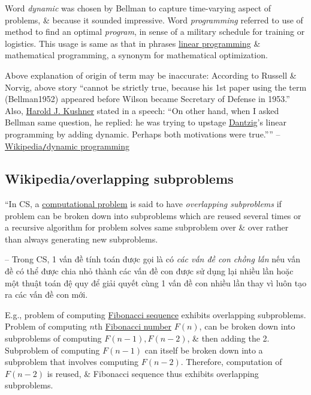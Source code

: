 \documentclass{article}
\begin{document}
Word {\it dynamic} was chosen by {\sc Bellman} to capture time-varying aspect of problems, \& because it sounded impressive. Word {\it programming} referred to use of method to find an optimal {\it program}, in sense of a military schedule for training or logistics. This usage is same as that in phrases \href{https://en.wikipedia.org/wiki/Linear_programming}{linear programming} \& mathematical programming, a synonym for mathematical optimization.

Above explanation of origin of term may be inaccurate: According to {\sc Russell \& Norvig}, above story ``cannot be strictly true, because his 1st paper using the term (Bellman1952) appeared before {\sc Wilson} became Secretary of Defense in 1953.'' Also, \href{https://en.wikipedia.org/wiki/Harold_J._Kushner}{\sc Harold J. Kushner} stated in a speech: ``On other hand, when I asked {\sc Bellman} same question, he replied: he was trying to upstage \href{https://en.wikipedia.org/wiki/George_Dantzig}{\sc Dantzig}'s linear programming by adding dynamic. Perhaps both motivations were true.'''' -- \href{https://en.wikipedia.org/wiki/Dynamic_programming}{Wikipedia{\tt/}dynamic programming}


\subsection{Wikipedia{\tt/}overlapping subproblems}
``In CS, a \href{https://en.wikipedia.org/wiki/Computational_problem}{computational problem} is said to have {\it overlapping subproblems} if problem can be broken down into subproblems which are reused several times or a recursive algorithm for problem solves same subproblem over \& over rather than always generating new subproblems.

-- Trong CS, 1 vấn đề tính toán được gọi là có {\it các vấn đề con chồng lấn} nếu vấn đề có thể được chia nhỏ thành các vấn đề con được sử dụng lại nhiều lần hoặc một thuật toán đệ quy để giải quyết cùng 1 vấn đề con nhiều lần thay vì luôn tạo ra các vấn đề con mới.

E.g., problem of computing \href{https://en.wikipedia.org/wiki/Fibonacci_sequence}{Fibonacci sequence} exhibits overlapping subproblems. Problem of computing $n$th \href{https://en.wikipedia.org/wiki/Fibonacci_number}{Fibonacci number} $F(n)$, can be broken down into subproblems of computing $F(n - 1),F(n - 2)$, \& then adding the 2. Subproblem of computing $F(n - 1)$ can itself be broken down into a subproblem that involves computing $F(n - 2)$. Therefore, computation of $F(n - 2)$ is reused, \& Fibonacci sequence thus exhibits overlapping subproblems.
\end{document}
